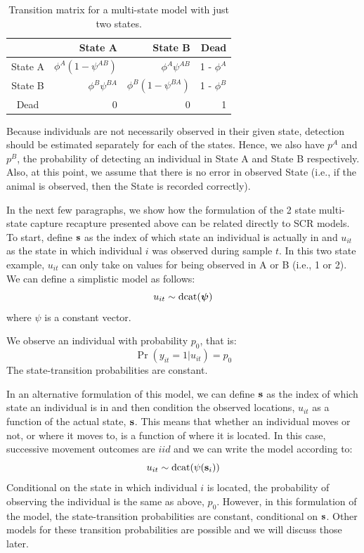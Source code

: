 \begin{table}[htb!]
\centering
\caption{
Transition matrix for a multi-state model with just two states.
}
\begin{tabular}{crrr}
\hline \hline
    &   State A &   State B   &   Dead \\  \hline
State A & $\phi^A(1-\psi^{AB})$ & $\phi^A \psi^{AB}$ & 1 - $\phi^A$ \\
State B & $\phi^B \psi^{BA}$ & $\phi^B(1-\psi^{BA})$ & 1 - $\phi^B$ \\
Dead & 0 & 0 & 1\\ \hline
\end{tabular}
\label{open.tab.CJSmulti-matrix}
\end{table}

Because individuals are not necessarily observed in their given state,
detection should be estimated separately for each of the states.
Hence, we also have $p^A$ and $p^B$, the probability of detecting an
individual in State A and State B respectively.  Also, at this point,
we assume that there is no error in observed State (i.e., if the
animal is observed, then the State is recorded correctly).

In the next few paragraphs, we show how the formulation of the 2 state
multi-state capture recapture presented above can be related directly
to SCR models.  To start, define ${\bf s}$ as the index of which state
an individual is actually in and $u_{it}$ as the state in which
individual $i$ was observed during sample $t$.  In this two state
example, $u_{it}$ can only take on values for being observed in A or B
(i.e., 1 or 2).  We can define a simplistic model as follows:
\[
u_{it} \sim  \mathrm{dcat}(\mbox{\boldmath$\psi$})
\]
where $\psi$ is a constant vector.

We observe an individual with probability $p_{0}$, that is:
\[
 \Pr(y_{it} = 1| u_{it} )  = p_{0}
\]
The state-transition probabilities are constant.

In an alternative formulation of this model, we can define ${\bf s}$
as the index of which state an individual is in and then condition the
observed locations, $u_{it}$ as a function of the actual state, ${\bf
  s}$. This means that whether an individual moves or not, or where it
moves to, is a function of where it is located.  In this case,
successive movement outcomes are $iid$ and we can write the model
according to:
\[
u_{it} \sim  \text{dcat}( {\psi}({\bf s}_{i}) )
\]
Conditional on the state in which individual $i$ is located, the
probability of observing the individual is the same as above, $p_{0}$.
However, in this formulation of the model, the state-transition
probabilities are constant, conditional on ${\bf s}$.  Other models
for these transition probabilities are possible and we will discuss
those later.

